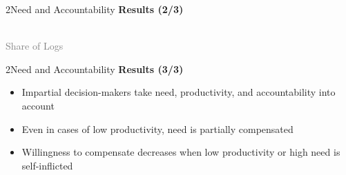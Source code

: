 \documentclass[xcolor=table,9pt,aspectratio=169]{beamer}
\begin{document}
\begin{frame}{\vspace*{10mm}2\hspace*{1em}Need and Accountability}
\textbf{Results (2/3)}\\
\medskip
\begin{center}
   \\
   \textcolor{gray}{Share of Logs}
\end{center}
\end{frame}


\begin{frame}{\vspace*{10mm}2\hspace*{1em}Need and Accountability}
\textbf{Results (3/3)}\\
\medskip
\begin{itemize}
   \item Impartial decision-makers take need, productivity, and accountability into account
   \item Even in cases of low productivity, need is partially compensated
   \item Willingness to compensate decreases when low productivity or high need is self-inflicted
\end{itemize}
\end{frame}
\end{document}
